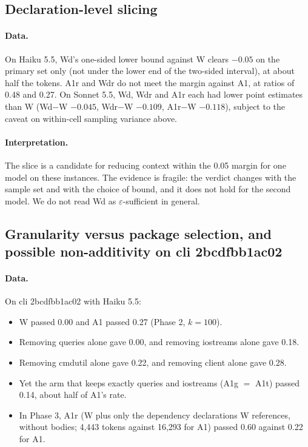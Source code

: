 \documentclass[10pt]{article}
\newcommand{\eps}{\varepsilon}
\begin{document}
\subsection{Declaration-level slicing}

\paragraph{Data.} On Haiku 5.5, Wd's one-sided lower bound against W clears $-0.05$ on the primary set only (not under the lower end of the two-sided interval), at about half the tokens. A1r and Wdr do not meet the margin against A1, at ratios of 0.48 and 0.27. On Sonnet 5.5, Wd, Wdr and A1r each had lower point estimates than W (Wd$-$W $-0.045$, Wdr$-$W $-0.109$, A1r$-$W $-0.118$), subject to the caveat on within-cell sampling variance above.

\paragraph{Interpretation.} The slice is a candidate for reducing context within the 0.05 margin for one model on these instances. The evidence is fragile: the verdict changes with the sample set and with the choice of bound, and it does not hold for the second model. We do not read Wd as $\eps$-sufficient in general.

\subsection{Granularity versus package selection, and possible non-additivity on cli 2bcdfbb1ac02}

\paragraph{Data.} On cli 2bcdfbb1ac02 with Haiku 5.5:
\begin{itemize}
\item W passed 0.00 and A1 passed 0.27 (Phase 2, $k=100$).
\item Removing queries alone gave 0.00, and removing iostreams alone gave 0.18.
\item Removing cmdutil alone gave 0.22, and removing client alone gave 0.28.
\item Yet the arm that keeps exactly queries and iostreams (A1g $=$ A1t) passed 0.14, about half of A1's rate.
\item In Phase 3, A1r (W plus only the dependency declarations W references, without bodies; 4,443 tokens against 16,293 for A1) passed 0.60 against 0.22 for A1.
\end{itemize}
\end{document}
